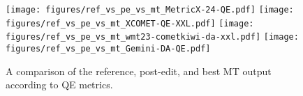 \begin{figure*}[t]
    \centering
    \texttt{[image: figures/ref\_vs\_pe\_vs\_mt\_MetricX-24-QE.pdf]}
    \texttt{[image: figures/ref\_vs\_pe\_vs\_mt\_XCOMET-QE-XXL.pdf]}
    \texttt{[image: figures/ref\_vs\_pe\_vs\_mt\_wmt23-cometkiwi-da-xxl.pdf]}
    \texttt{[image: figures/ref\_vs\_pe\_vs\_mt\_Gemini-DA-QE.pdf]}
    \caption{A comparison of the reference, post-edit, and best MT output according to QE metrics.}
    \label{fig:ref_vs_pe_vs_mt_all}
\end{figure*}